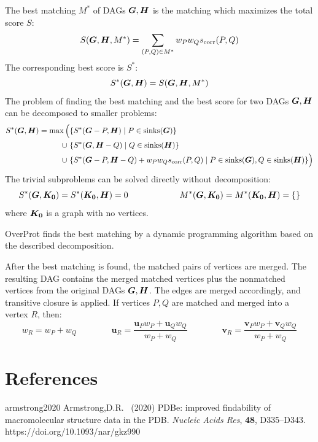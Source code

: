 \documentclass{article}
\begin{document}
The best matching \(M^*\) of DAGs \(\boldsymbol{G}, \boldsymbol{H}\) is the matching which maximizes 
the total score \(S\):
  \[  S(\boldsymbol{G}, \boldsymbol{H}, M^*) = \sum_{(P, Q) \in M^*} w_{P} w_{Q} s_\mathrm{corr}(P, Q)  \]
The corresponding best score is \(S^*\):
  \[  S^*(\boldsymbol{G}, \boldsymbol{H}) = S(\boldsymbol{G}, \boldsymbol{H}, M^*)  \]
The problem of finding the best matching and the best score 
for two DAGs \(\boldsymbol{G}, \boldsymbol{H}\) can be decomposed 
to smaller problems:
  \[ \begin{aligned}
    S^*(\boldsymbol{G}, \boldsymbol{H}) = \max\Big( & \{ S^*(\boldsymbol{G}-P, \boldsymbol{H}) \mid P \in \mathrm{sinks}(\boldsymbol{G}) \} \\
                                \cup\     & \{ S^*(\boldsymbol{G}, \boldsymbol{H}-Q) \mid Q \in \mathrm{sinks}(\boldsymbol{H}) \} \\
                                \cup\     & \{ S^*(\boldsymbol{G}-P, \boldsymbol{H}-Q) + w_{P} w_{Q} s_\mathrm{corr}(P, Q) \mid P \in \mathrm{sinks}(\boldsymbol{G}), Q \in \mathrm{sinks}(\boldsymbol{H}) \} \Big)  
  \end{aligned} \]
The trivial subproblems can be solved directly without decomposition: 
  \[  S^*(\boldsymbol{G}, \boldsymbol{K_0}) = S^*(\boldsymbol{K_0}, \boldsymbol{H}) = 0  \qquad \qquad \qquad  
      M^*(\boldsymbol{G}, \boldsymbol{K_0}) = M^*(\boldsymbol{K_0}, \boldsymbol{H}) = \{\}  
  \]
where \(\boldsymbol{K_0}\) is a graph with no vertices.

OverProt finds the best matching by a dynamic programming 
algorithm based on the described decomposition.

After the best matching is found, the matched pairs of vertices are merged. 
The resulting DAG contains the merged matched vertices 
plus the nonmatched vertices from the original DAGs \(\boldsymbol{G}, \boldsymbol{H}\).
The edges are merged accordingly, and transitive closure is applied.
If vertices \(P, Q\) are matched and merged into a vertex \(R\), then:
  \[  w_R = w_P + w_Q  \qquad\qquad
      \mathbf{u}_R = \frac{\mathbf{u}_P w_P + \mathbf{u}_Q w_Q}{w_P + w_Q}  \qquad\qquad
      \mathbf{v}_R = \frac{\mathbf{v}_P w_P + \mathbf{v}_Q w_Q}{w_P + w_Q}  
  \]



\section{References}

\myreference
{armstrong2020}
{Armstrong,D.R. \etal\ (2020) 
PDBe: improved findability of macromolecular structure data in the PDB. 
\emph{Nucleic Acids Res}, \textbf{48}, D335--D343.}
{https://doi.org/10.1093/nar/gkz990}
\end{document}
